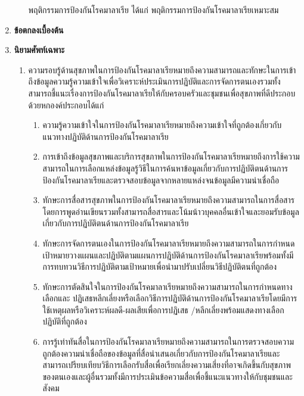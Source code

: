 \begin{titlepage}
\begin{enumerate}
\begin{itemize}
                  พฤติกรรมการป้องกันโรคมาลาเรีย ได้แก่ พฤติกรรมการป้องกันโรคมาลาเรียเหมาะสม
          \end{itemize}

          \item\textbf{ข้อตกลงเบื้องต้น}

          \item\textbf{นิยามศัพท์เฉพาะ}
          \begin{enumerate}
            \item ความรอบรู้ด้านสุขภาพในการป้องกันโรคมาลาเรียหมายถึงความสามารถและทักษะในการเข้าถึงข้อมูลความรู้ความเข้าใจเพื่อวิเคราะห์ประเมินการปฏิบัติและการจัดการตนเองรวมทั้งสามารถชี้แนะเรื่องการป้องกันโรคมาลาเรียให้กับครอบครัวและชุมชนเพื่อสุขภาพที่ดีประกอบด้วยหกองค์ประกอบได้แก่
                  \begin{enumerate}
                    \item ความรู้ความเข้าใจในการป้องกันโรคมาลาเรียหมายถึงความเข้าใจที่ถูกต้องเกี่ยวกับแนวทางปฏิบัติด้านการป้องกันโรคมาลาเรีย
                    \item การเข้าถึงข้อมูลสุขภาพและบริการสุขภาพในการป้องกันโรคมาลาเรียหมายถึงการใช้ความสามารถในการเลือกแหล่งข้อมูลรู้วิธีในการค้นหาข้อมูลเกี่ยวกับการปฏิบัติตนด้านการป้องกันโรคมาลาเรียและตรวจสอบข้อมูลจากหลายแหล่งจนข้อมูลมีความน่าเชื่อถือ
                    \item ทักษะการสื่อสารสุขภาพในการป้องกันโรคมาลาเรียหมายถึงความสามารถในการสื่อสารโดยการพูดอ่านเขียนรวมทั้งสามารถสื่อสารและโน้มน้าวบุคคลอื่นเข้าใจและยอมรับข้อมูลเกี่ยวกับการปฏิบัติตนด้านการป้องกันโรคมาลาเรีย
                    \item ทักษะการจัดการตนเองในการป้องกันโรคมาลาเรียหมายถึงความสามารถในการกำหนดเป้าหมายวางแผนและปฏิบัติตามแผนการปฎิบัติด้านการป้องกันโรคมาลาเรียพร้อมทั้งมีการทบทวนวิธีการปฏิบัติตามเป้าหมายเพื่อนำมาปรับเปลี่ยนวิธีปฏิบัติตนที่ถูกต้อง
                    \item ทักษะการตัดสินใจในการป้องกันโรคมาลาเรียหมายถึงความสามารถในการกำหนดทางเลือกและ ปฏิเสธหลีกเลี่ยงหรือเลือกวิธีการปฏิบัติด้านการป้องกันโรคมาลาเรียโดยมีการใช้เหตุผลหรือวิเคราะห์ผลดี-ผลเสียเพื่อการปฏิเสธ /หลีกเลี่ยงพร้อมแสดงทางเลือกปฏิบัติที่ถูกต้อง
                    \item การรู้เท่าทันสื่อในการป้องกันโรคมาลาเรียหมายถึงความสามารถในการตรวจสอบความถูกต้องความน่าเชื่อถือของข้อมูลที่สื่อนำเสนอเกี่ยวกับการป้องกันโรคมาลาเรียและสามารถเปรียบเทียบวิธีการเลือกรับสื่อเพื่อเรียกเลี่ยงความเสี่ยงที่อาจเกิดขึ้นกับสุขภาพของตนเองและผู้อื่นรวมทั้งมีการประเมินข้อความสื่อเพื่อชี้แนะแนวทางให้กับชุมชนและสังคม
                  \end{enumerate}


\end{enumerate}
\end{enumerate}
\end{titlepage}

